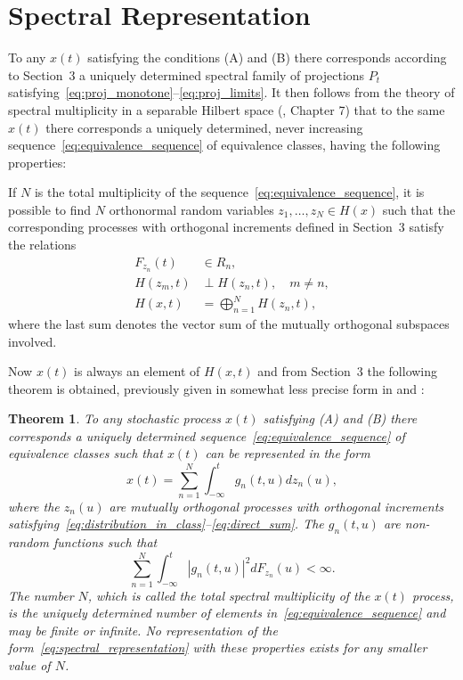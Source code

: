 \documentclass[11pt]{article}
\newtheorem{theorem}{Theorem}
\begin{document}
\section{Spectral Representation}

To any $x(t)$ satisfying the conditions (A) and (B) there corresponds according to Section~3 a uniquely determined spectral family of projections $P_t$ satisfying~\eqref{eq:proj_monotone}--\eqref{eq:proj_limits}. It then follows from the theory of spectral multiplicity in a separable Hilbert space (\cite{stone1932}, Chapter 7) that to the same $x(t)$ there corresponds a uniquely determined, never increasing sequence~\eqref{eq:equivalence_sequence} of equivalence classes, having the following properties:

If $N$ is the total multiplicity of the sequence~\eqref{eq:equivalence_sequence}, it is possible to find $N$ orthonormal random variables $z_1, \ldots, z_N \in H(x)$ such that the corresponding processes with orthogonal increments defined in Section~3 satisfy the relations
\begin{align}
F_{z_n}(t) &\in R_n, \label{eq:distribution_in_class}\\
H(z_m, t) &\perp H(z_n, t), \quad m \neq n, \label{eq:orthogonal_subspaces}\\
H(x, t) &= \bigoplus_{n=1}^N H(z_n, t), \label{eq:direct_sum}
\end{align}
where the last sum denotes the vector sum of the mutually orthogonal subspaces involved.

Now $x(t)$ is always an element of $H(x, t)$ and from Section~3 the following theorem is obtained, previously given in somewhat less precise form in \cite{cramer1951} and \cite{cramer1961}:

\begin{theorem}\label{thm:spectral_representation}
To any stochastic process $x(t)$ satisfying (A) and (B) there corresponds a uniquely determined sequence~\eqref{eq:equivalence_sequence} of equivalence classes such that $x(t)$ can be represented in the form
\begin{equation}
x(t) = \sum_{n=1}^N \int_{-\infty}^t g_n(t, u) dz_n(u),
\label{eq:spectral_representation}
\end{equation}
where the $z_n(u)$ are mutually orthogonal processes with orthogonal increments satisfying~\eqref{eq:distribution_in_class}--\eqref{eq:direct_sum}. The $g_n(t, u)$ are non-random functions such that
\begin{equation}
\sum_{n=1}^N \int_{-\infty}^t |g_n(t, u)|^2 dF_{z_n}(u) < \infty.
\label{eq:convergence_condition}
\end{equation}
The number $N$, which is called the total spectral multiplicity of the $x(t)$ process, is the uniquely determined number of elements in~\eqref{eq:equivalence_sequence} and may be finite or infinite. No representation of the form~\eqref{eq:spectral_representation} with these properties exists for any smaller value of $N$.
\end{theorem}
\end{document}
